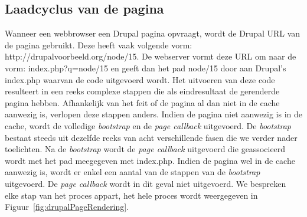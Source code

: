 \subsection{Laadcyclus van de pagina}
Wanneer een webbrowser een Drupal pagina opvraagt, wordt de Drupal URL van de pagina gebruikt. Deze heeft vaak volgende vorm: http://drupalvoorbeeld.org/node/15. De webserver vormt deze URL om naar de vorm: index.php?q=node/15 en geeft dan het pad node/15 door aan Drupal's index.php waarvan de code uitgevoerd wordt. Het uitvoeren van deze code resulteert in een reeks complexe stappen die als eindresultaat de gerenderde pagina hebben. Afhankelijk van het feit of de pagina al dan niet in de cache aanwezig is, verlopen deze stappen anders. Indien de pagina niet aanwezig is in de cache, wordt de volledige \textit{bootstrap} en de \textit{page callback} uitgevoerd. De \textit{bootstrap} bestaat steeds uit dezelfde reeks van acht verschillende fasen die we verder nader toelichten. Na de \textit{bootstrap} wordt de \textit{page callback} uitgevoerd die geassocieerd wordt met het pad meegegeven met index.php. Indien de pagina wel in de cache aanwezig is, wordt er enkel een aantal van de stappen van de \textit{bootstrap} uitgevoerd. De \textit{page callback} wordt in dit geval niet uitgevoerd. We bespreken elke stap van het proces appart, het hele proces wordt weergegeven in Figuur~\ref{fig:drupalPageRendering}.


